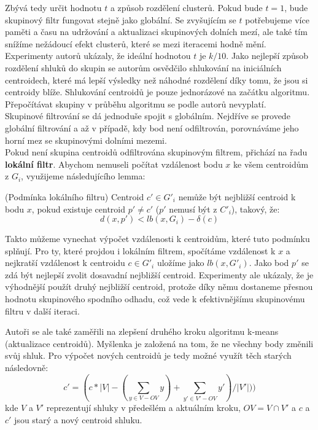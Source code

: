 Zbývá tedy určit hodnotu $t$ a způsob rozdělení clusterů. Pokud bude $t=1$, bude skupinový filtr fungovat stejně jako globální. Se zvyšujícím se $t$ potřebujeme více paměti a času na udržování a aktualizaci skupinových dolních mezí, ale také tím snížíme nežádoucí efekt clusterů, které se mezi iteracemi hodně mění. Experimenty autorů ukázaly, že ideální hodnotou $t$ je $k/10$. Jako nejlepší způsob rozdělení shluků do skupin se autorům osvědčilo shlukování na iniciálních centroidech, které má lepší výsledky než náhodné rozdělení díky tomu, že jsou si centroidy blíže. Shlukování centroidů je pouze jednorázové na začátku algoritmu. Přepočítávat skupiny v průběhu algoritmu se podle autorů nevyplatí.\\

Skupinové filtrování se dá jednoduše spojit s globálním. Nejdříve se provede globální filtrování a až v případě, kdy bod není odfiltrován, porovnáváme jeho horní mez se skupinovými dolními mezemi.\\

Pokud není skupina centroidů odfiltrována skupinovým filtrem, přichází na řadu \textbf{lokální filtr}. Abychom nemuseli počítat vzdálenost bodu $x$ ke všem centroidům z $G_i$, využijeme následujícího lemma:
\begin{lemma}
(Podmínka lokálního filtru) Centroid $c' \in G'_i$ nemůže být nejbližší centroid k bodu $x$, pokud existuje centroid $p' \ne c'$ ($p'$ nemusí být z $C'_i$), takový, že:
$$d(x,p') < lb(x, G_i)-\delta(c)$$
\end{lemma}
Takto můžeme vynechat výpočet vzdálenosti k centroidům, které tuto podmínku splňují. Pro ty, které projdou i lokálním filtrem, spočítáme vzdálenost k $x$ a nejkratší vzdálenost k centroidu $c \in G'_i$ uložíme jako $lb(x,G'_i)$. Jako bod $p'$ se zdá být nejlepší zvolit dosavadní nejbližší centroid. Experimenty ale ukázaly, že je výhodnější použít druhý nejbližší centroid, protože díky němu dostaneme přesnou hodnotu skupinového spodního odhadu, což vede k efektivnějšímu skupinovému filtru v další iteraci.

Autoři se ale také zaměřili na zlepšení druhého kroku algoritmu k-means (aktualizace centroidů). Myšlenka je založená na tom, že ne všechny body změnili svůj shluk. Pro výpočet nových centroidů je tedy možné využít těch starých následovně:
$$c' = (c \ast |V| -(\sum\limits_{y\in V-OV}y) + \sum\limits_{y'\in V'-OV}y')/|V'|))$$
kde $V$ a $V'$ reprezentují shluky v předešlém a aktuálním kroku, $OV = V\cap V'$ a $c$ a $c'$ jsou starý a nový centroid shluku.\\

